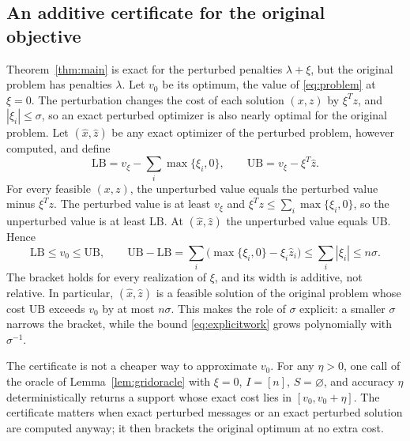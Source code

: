 \subsection{An additive certificate for the original objective}
\label{sec:spectral-certificate}
Theorem~\ref{thm:main} is exact for the perturbed penalties
$\lambda+\xi$, but the original problem has penalties $\lambda$. Let
$v_0$ be its optimum, the value of \eqref{eq:problem} at $\xi=0$. The
perturbation changes the cost of each solution $(x,z)$ by $\xi^Tz$, and
$|\xi_i|\le\sigma$, so an exact perturbed optimizer is also nearly
optimal for the original problem. Let $(\widehat x,\widehat z)$ be any
exact optimizer of the perturbed problem, however computed, and define
\begin{equation}\label{eq:certificate}
 \mathrm{LB}=v_\xi-\sum_i\max\{\xi_i,0\},\qquad
 \mathrm{UB}=v_\xi-\xi^T\widehat z.
\end{equation}
For every feasible $(x,z)$, the unperturbed value equals the perturbed
value minus $\xi^Tz$. The perturbed value is at least $v_\xi$ and
$\xi^Tz\le\sum_i\max\{\xi_i,0\}$, so the unperturbed value is at least
$\mathrm{LB}$. At $(\widehat x,\widehat z)$ the unperturbed value equals
$\mathrm{UB}$. Hence
\begin{equation}\label{eq:certgap}
 \mathrm{LB}\le v_0\le\mathrm{UB},\qquad
 \mathrm{UB}-\mathrm{LB}
 =\sum_i\bigl(\max\{\xi_i,0\}-\xi_i\widehat z_i\bigr)
 \le\sum_i|\xi_i|\le n\sigma.
\end{equation}
The bracket holds for every realization of $\xi$, and its width is
additive, not relative. In particular, $(\widehat x,\widehat z)$ is a
feasible solution of the original problem whose cost $\mathrm{UB}$
exceeds $v_0$ by at most $n\sigma$. This makes the role of $\sigma$
explicit: a smaller $\sigma$ narrows the bracket, while the bound
\eqref{eq:explicitwork} grows polynomially with $\sigma^{-1}$.

The certificate is not a cheaper way to approximate $v_0$. For any
$\eta>0$, one call of the oracle of Lemma~\ref{lem:gridoracle} with
$\xi=0$, $I=[n]$, $S=\varnothing$, and accuracy $\eta$ deterministically
returns a support whose exact cost lies in $[v_0,v_0+\eta]$. The
certificate matters when exact perturbed messages or an exact perturbed
solution are computed anyway; it then brackets the original optimum at
no extra cost.
